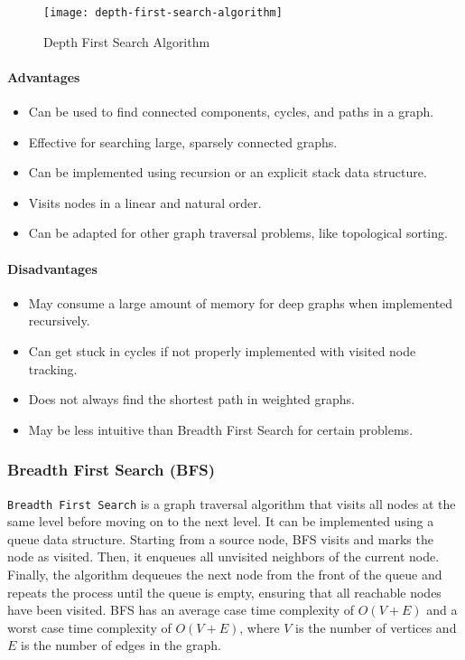 \begin{figure}[H]
    \centering
    \texttt{[image: depth-first-search-algorithm]}
    \caption{Depth First Search Algorithm \cite{zaltsman_dfs_bfs}}
    \label{fig:depth-first-search-algorithm}
\end{figure}

\paragraph{Advantages}
\begin{itemize}
    \item Can be used to find connected components, cycles, and paths in a graph.
    \item Effective for searching large, sparsely connected graphs.
    \item Can be implemented using recursion or an explicit stack data structure.
    \item Visits nodes in a linear and natural order.
    \item Can be adapted for other graph traversal problems, like topological sorting.
\end{itemize}
\paragraph{Disadvantages}
\begin{itemize}
    \item May consume a large amount of memory for deep graphs when implemented recursively.
    \item Can get stuck in cycles if not properly implemented with visited node tracking.
    \item Does not always find the shortest path in weighted graphs.
    \item May be less intuitive than Breadth First Search for certain problems.
\end{itemize}

\subsubsection{Breadth First Search (BFS)}
\lstinline{Breadth First Search} is a graph traversal algorithm that visits all nodes at the same level before moving on to the next level. It can be implemented using a queue data structure. Starting from a source node, BFS visits and marks the node as visited. Then, it enqueues all unvisited neighbors of the current node. Finally, the algorithm dequeues the next node from the front of the queue and repeats the process until the queue is empty, ensuring that all reachable nodes have been visited. BFS has an average case time complexity of $O(V + E)$ and a worst case time complexity of $O(V + E)$, where $V$ is the number of vertices and $E$ is the number of edges in the graph.

